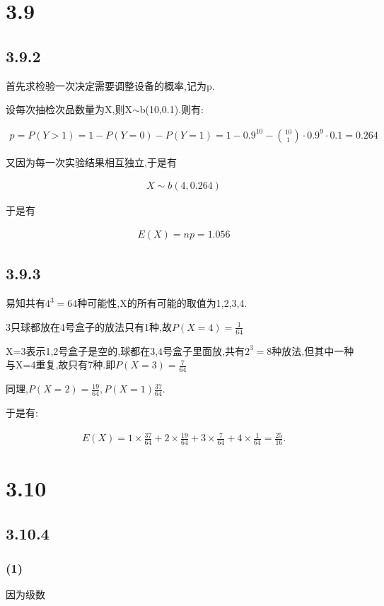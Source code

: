 \documentclass[12pt,a4paper,fontset=none]{ctexart}
\begin{document}
\section*{3.9}
\subsection*{3.9.2}
首先求检验一次决定需要调整设备的概率,记为p.

设每次抽检次品数量为X,则X$\sim $b(10,0.1).则有:

\begin{align*}
	p=P(Y>1)=1-P(Y=0)-P(Y=1)=1-0.9^{10}-\binom{10}{1}\cdot 0.9^9\cdot 0.1=0.264
\end{align*}

又因为每一次实验结果相互独立,于是有

\begin{align*}
	X\sim b(4,0.264)
\end{align*}

于是有

\begin{align*}
	E(X)=np=1.056
\end{align*}

\subsection*{3.9.3}
易知共有$4^3=64$种可能性,X的所有可能的取值为1,2,3,4.

3只球都放在4号盒子的放法只有1种,故$P(X=4)=\frac{1}{64} $

X=3表示1,2号盒子是空的,球都在3,4号盒子里面放,共有$2^3=8$种放法,但其中一种与X=4重复,故只有7种.即$P(X=3)=\frac{7}{64} $

同理,$P(X=2)=\frac{19}{64},P(X=1)\frac{37}{64}  $.

于是有:

\begin{align*}
	E(X)=1\times \frac{37}{64} +2\times \frac{19}{64} +3\times \frac{7}{64}+4\times \frac{1}{64} =\frac{25}{16}.
\end{align*}

\section*{3.10}
\subsection*{3.10.4}
\subsubsection*{(1)}
因为级数
\end{document}
